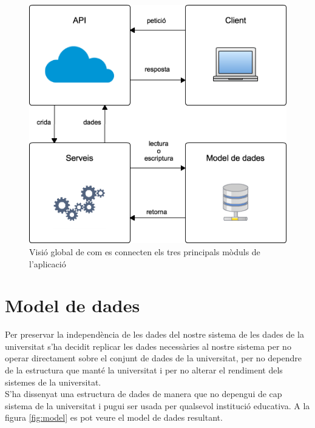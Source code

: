 \begin{figure}[h!]
    \includegraphics[scale=0.6]{img/estructura.png}
    \centering
    \caption{Visió global de com es connecten els tres principals mòduls de l'aplicació}
    \label{fig:estructura}
\end{figure}

\section{Model de dades}
 
Per preservar la independència de les dades del nostre sistema de les dades de la universitat s'ha decidit replicar les dades necessàries al nostre sistema per no operar directament sobre el conjunt de dades de la universitat, per no dependre de la estructura que manté la universitat i per no alterar el rendiment dels sistemes de la universitat.\\

S'ha dissenyat una estructura de dades de manera que no depengui de cap sistema de la universitat i pugui ser usada per qualsevol institució educativa. A la figura \ref{fig:model} es pot veure el model de dades resultant. \\

